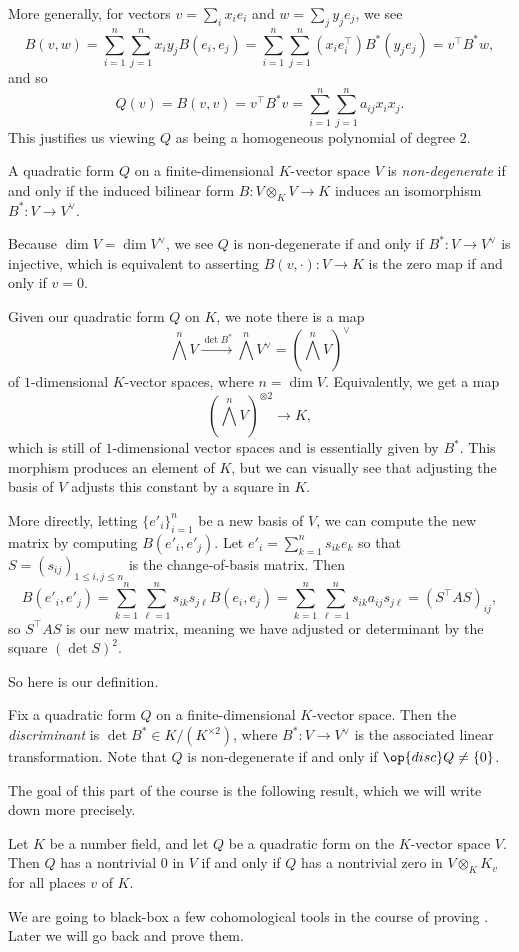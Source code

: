 \documentclass[../notes.tex]{subfiles}
\begin{document}
More generally, for vectors $v=\sum_ix_ie_i$ and $w=\sum_jy_je_j$, we see
\[B(v,w)=\sum_{i=1}^n\sum_{j=1}^nx_iy_jB(e_i,e_j)=\sum_{i=1}^n\sum_{j=1}^n(x_ie_i^\intercal)B^*(y_je_j)=v^\intercal B^*w,\]
and so
\[Q(v)=B(v,v)=v^\intercal B^*v=\sum_{i=1}^n\sum_{j=1}^na_{ij}x_ix_j.\]
This justifies us viewing $Q$ as being a homogeneous polynomial of degree $2$.
\begin{definition}
	A quadratic form $Q$ on a finite-dimensional $K$-vector space $V$ is \textit{non-degenerate} if and only if the induced bilinear form $B\colon V\otimes_KV\to K$ induces an isomorphism $B^*\colon V\to V^\lor$.
\end{definition}
\begin{remark} \label{rem:non-degenerate-bilin}
	Because $\dim V=\dim V^\lor$, we see $Q$ is non-degenerate if and only if $B^*\colon V\to V^\lor$ is injective, which is equivalent to asserting $B(v,\cdot)\colon V\to K$ is the zero map if and only if $v=0$.
\end{remark}
Given our quadratic form $Q$ on $K$, we note there is a map
\[\bigwedge^nV\xrightarrow{\det B^*}\bigwedge^nV^\lor=\left(\bigwedge^nV\right)^\lor\]
of $1$-dimensional $K$-vector spaces, where $n=\dim V$. Equivalently, we get a map
\[\left(\bigwedge^nV\right)^{\otimes2}\to K,\]
which is still of $1$-dimensional vector spaces and is essentially given by $B^*$. This morphism produces an element of $K$, but we can visually see that adjusting the basis of $V$ adjusts this constant by a square in $K$.

More directly, letting $\{e'_i\}_{i=1}^n$ be a new basis of $V$, we can compute the new matrix by computing $B(e'_i,e'_j)$. Let $e'_i=\sum_{k=1}^ns_{ik}e_k$ so that $S=(s_{ij})_{1\le i,j\le n}$ is the change-of-basis matrix. Then
\[B(e'_i,e'_j)=\sum_{k=1}^n\sum_{\ell=1}^ns_{ik}s_{j\ell}B(e_i,e_j)=\sum_{k=1}^n\sum_{\ell=1}^ns_{ik}a_{ij}s_{j\ell}=(S^\intercal AS)_{ij},\]
so $S^\intercal AS$ is our new matrix, meaning we have adjusted or determinant by the square $(\det S)^2$.

So here is our definition.
\begin{definition}[discriminant]
	Fix a quadratic form $Q$ on a finite-dimensional $K$-vector space. Then the \textit{discriminant} is $\det B^*\in K/\left(K^{\times2}\right)$, where $B^*\colon V\to V^\lor$ is the associated linear transformation. Note that $Q$ is non-degenerate if and only if $\op{disc}Q\ne\{0\}$.
\end{definition}
The goal of this part of the course is the following result, which we will write down more precisely.
\begin{theorem} \label{thm:hasse-mink}
	Let $K$ be a number field, and let $Q$ be a quadratic form on the $K$-vector space $V$. Then $Q$ has a nontrivial $0$ in $V$ if and only if $Q$ has a nontrivial zero in $V\otimes_KK_v$ for all places $v$ of $K$.
\end{theorem}
We are going to black-box a few cohomological tools in the course of proving . Later we will go back and prove them.
\end{document}
